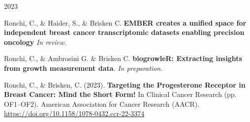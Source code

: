 

\begin{cventries}

\cventry
  {}
  {2023} %
  {}{}
  {
    \begin{cvitems} %
      \item {Ronchi, C., \& Haider, S., \& Brisken C. \textbf{EMBER creates a unified space for independent breast cancer transcriptomic datasets enabling precision oncology} \textit{In review.}}
      \item {Ronchi, C., \& Ambrosini G. \& Brisken C. \textbf{biogrowleR: Extracting insights 
             from growth measurement data}. \textit{In preparation.}}
      \item {Ronchi, C., \& Brisken, C. (2023). \textbf{Targeting the Progesterone Receptor 
             in Breast Cancer: Mind the Short Form!} In Clinical Cancer Research
             (pp. OF1–OF2). American Association for Cancer Research (AACR). 
             \url{https://doi.org/10.1158/1078-0432.ccr-22-3374}}
    \end{cvitems}
  }

\end{cventries}
